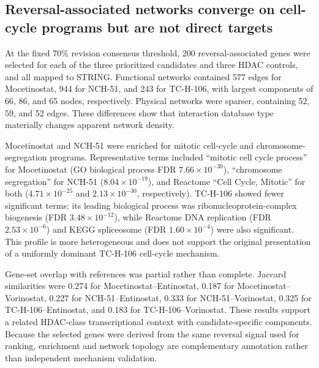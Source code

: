 \subsection{Reversal-associated networks converge on cell-cycle programs but are not direct targets}

\begin{minorrevision}
At the fixed 70\% revision consensus threshold, 200 reversal-associated genes were selected for each of the three prioritized candidates and three HDAC controls, and all mapped to STRING. Functional networks contained 577 edges for Mocetinostat, 944 for NCH-51, and 243 for TC-H-106, with largest components of 66, 86, and 65 nodes, respectively. Physical networks were sparser, containing 52, 59, and 52 edges. These differences show that interaction database type materially changes apparent network density.\par
\end{minorrevision}

Mocetinostat and NCH-51 were enriched for mitotic cell-cycle and chromosome-segregation programs. Representative terms included ``mitotic cell cycle process'' for Mocetinostat (GO biological process FDR $7.66\times10^{-30}$), ``chromosome segregation'' for NCH-51 ($8.04\times10^{-19}$), and Reactome ``Cell Cycle, Mitotic'' for both ($4.71\times10^{-25}$ and $2.13\times10^{-30}$, respectively). TC-H-106 showed fewer significant terms; its leading biological process was ribonucleoprotein-complex biogenesis (FDR $3.48\times10^{-12}$), while Reactome DNA replication (FDR $2.53\times10^{-6}$) and KEGG spliceosome (FDR $1.60\times10^{-4}$) were also significant. This profile is more heterogeneous and does not support the original presentation of a uniformly dominant TC-H-106 cell-cycle mechanism.

Gene-set overlap with references was partial rather than complete. Jaccard similarities were 0.274 for Mocetinostat--Entinostat, 0.187 for Mocetinostat--Vorinostat, 0.227 for NCH-51--Entinostat, 0.333 for NCH-51--Vorinostat, 0.325 for TC-H-106--Entinostat, and 0.183 for TC-H-106--Vorinostat. These results support a related HDAC-class transcriptional context with candidate-specific components. Because the selected genes were derived from the same reversal signal used for ranking, enrichment and network topology are complementary annotation rather than independent mechanism validation.

